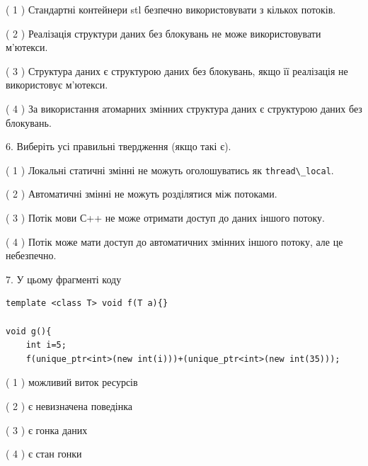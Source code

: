 \documentclass[12pt, ukrainian]{article}
\def\code#1{\Verb!#1!}
\begin{document}
\begin {large}
{( 1 ) Стандартні контейнери stl безпечно використовувати з кількох потоків.%

( 2 ) Реалізація структури даних без блокувань не може використовувати м’ютекси.%

( 3 ) Структура даних є структурою даних без блокувань, якщо її реалізація не використовує м’ютекси.%

( 4 ) За використання атомарних змінних структура даних є структурою даних без блокувань.%
\newpage



\vspace{5mm}
6. Виберіть усі правильні твердження (якщо такі є).\par
\vspace{2mm}

( 1 ) Локальні статичні змінні не можуть оголошуватись як \code{thread\_local}.%

( 2 ) Автоматичні змінні не можуть розділятися між потоками.%

( 3 ) Потік мови С++ не може отримати доступ до даних іншого потоку.%

( 4 ) Потік може мати доступ до автоматичних змінних іншого потоку, але це небезпечно.%


\vspace{5mm}
7. У цьому фрагменті коду
\begin{verbatim}
template <class T> void f(T a){}

void g(){
    int i=5;
    f(unique_ptr<int>(new int(i)))+(unique_ptr<int>(new int(35)));
\end{verbatim}
( 1 ) можливий виток ресурсів%

( 2 ) є невизначена поведінка%

( 3 ) є гонка даних%

( 4 ) є стан гонки%
}
\end {large}
\end{document}
